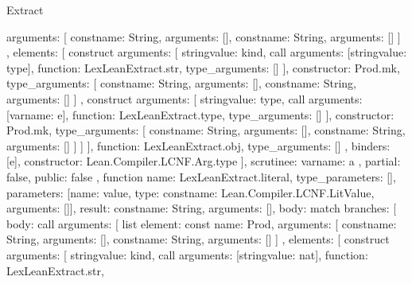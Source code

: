 \begin{lexlean}{Extract}
\begin{toolingmodule}
{{{{{{{                    arguments: [
                      const{name: String, arguments: []},
                      const{name: String, arguments: []}
                    ]
                  },
                  elements: [
                    construct{
                      arguments: [
                        string{value: kind},
                        call{
                          arguments: [string{value: type}],
                          function: LexLeanExtract.str,
                          type_arguments: []
                        }
                      ],
                      constructor: Prod.mk,
                      type_arguments: [
                        const{name: String, arguments: []},
                        const{name: String, arguments: []}
                      ]
                    },
                    construct{
                      arguments: [
                        string{value: type},
                        call{
                          arguments: [var{name: e}],
                          function: LexLeanExtract.type,
                          type_arguments: []
                        }
                      ],
                      constructor: Prod.mk,
                      type_arguments: [
                        const{name: String, arguments: []},
                        const{name: String, arguments: []}
                      ]
                    }
                  ]
                }
              ],
              function: LexLeanExtract.obj,
              type_arguments: []
            },
            binders: [e],
            constructor: Lean.Compiler.LCNF.Arg.type
          }
        ],
        scrutinee: var{name: a}
      },
      partial: false,
      public: false
    },
    function{
      name: LexLeanExtract.literal,
      type_parameters: [],
      parameters: [{name: value, type: const{name: Lean.Compiler.LCNF.LitValue, arguments: []}}],
      result: const{name: String, arguments: []},
      body: match{
        branches: [
          {
            body: call{
              arguments: [
                list{
                  element: const{
                    name: Prod,
                    arguments: [
                      const{name: String, arguments: []},
                      const{name: String, arguments: []}
                    ]
                  },
                  elements: [
                    construct{
                      arguments: [
                        string{value: kind},
                        call{
                          arguments: [string{value: nat}],
                          function: LexLeanExtract.str,
}}}}}}}}
\end{toolingmodule}
\end{lexlean}
